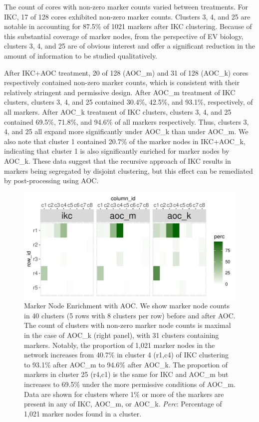 \documentclass[12pt, oneside]{article}   	%
\begin{document}
{The count of cores with non-zero marker counts varied between treatments. For IKC, 17 of 128 cores exhibited  non-zero marker counts. Clusters 3, 4, and 25 are notable in accounting for 87.5\% of 1021 markers after IKC clustering. Because of this substantial coverage of marker nodes, from the perspective of EV biology, clusters 3, 4, and 25 are of obvious interest and offer a significant reduction in the amount of information to be studied qualitatively.  

After IKC+AOC treatment, 20 of 128 (AOC\_m) and 31 of 128 (AOC\_k) cores respectively contained non-zero marker counts, which is consistent with their relatively stringent and permissive design. 
After AOC\_m treatment of IKC clusters, clusters 3, 4, and 25  contained 30.4\%, 42.5\%, and 93.1\%, respectively, of all markers. After AOC\_k treatment of IKC clusters, clusters  3, 4, and 25 contained 69.5\%, 71.8\%, and 94.6\% of all markers respectively.  Thus,  clusters 3, 4, and 25 all expand more significantly under AOC\_k than under AOC\_m. We also note that cluster 1  contained 20.7\% of the marker nodes in IKC+AOC\_k, indicating that cluster 1 is also significantly enriched for marker nodes by AOC\_k. 
These data  suggest that the recursive approach of IKC results in markers being segregated by disjoint clustering, but this effect can be remediated by post-processing using AOC.

 \begin{figure}[H]
\centering
\includegraphics[width=0.7\linewidth]{marker_comps_wide.pdf} 
\captionsetup{width=0.9\textwidth}
\caption{Marker Node Enrichment with AOC. We show marker node counts in 40 clusters (5 rows with 8 clusters per row) before and after AOC.  The count of clusters with non-zero marker node counts is maximal in the case of AOC\_k (right panel), with 31 clusters containing markers. Notably, the proportion of 1,021 marker nodes in the network increases from 40.7\% in cluster 4 (r1,c4) of IKC clustering to 93.1\% after AOC\_m to 94.6\% after AOC\_k. The proportion of markers in cluster 25 (r4,c1) is the same for IKC and AOC\_m but increases to  69.5\% under the more permissive conditions of AOC\_m. Data are shown for clusters where 1\% or more of the markers are present in any of IKC, AOC\_m, or AOC\_k. \emph{Perc}: Percentage of 1,021 marker nodes found in a cluster.}
\label{fig:marker-node-concentration}
\end{figure}
	
}
\end{document}
